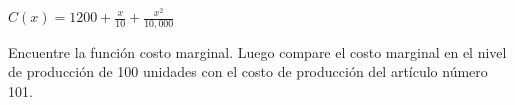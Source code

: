 \item $C(x) = 1200 + \frac{x}{10} + \frac{x^2}{10,000}$
\par
Encuentre la función costo marginal. Luego compare el costo marginal en el nivel de producción de 100 unidades con el costo de producción del artículo número 101.
